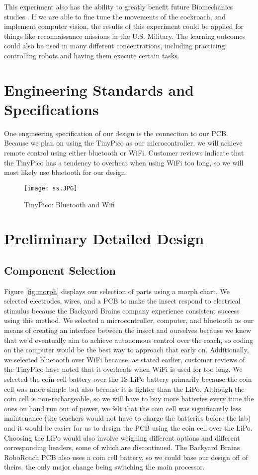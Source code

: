 \documentclass{article}
\begin{document}
 This experiment also has the ability to greatly benefit future  Biomechanics studies . If we are able to fine tune the movements of the cockroach, and implement computer vision, the results of this experiment could be applied for things like reconnaissance missions in the U.S. Military. The learning outcomes could also be used in many different concentrations, including practicing controlling robots and having them execute certain tasks. 

\section{Engineering Standards and Specifications}
 One engineering specification of our design is the connection to our PCB. Because we plan on using the TinyPico as our microcontroller, we will achieve remote control using either bluetooth or WiFi. Customer reviews indicate that the TinyPico has a tendency to overheat when using WiFi too long, so we will most likely use bluetooth for our design.

\begin{figure}[ht!]
\centering
\texttt{[image: ss.JPG]}
\caption{TinyPico: Bluetooth and Wifi}
\label{fig:ss}
\end{figure}

\section{Preliminary Detailed Design}

\subsection{Component Selection}
 Figure \ref{fig:morph} displays our selection of parts using a morph chart. We selected electrodes, wires, and a PCB to make the insect respond to electrical stimulus because the Backyard Brains company experience consistent success using this method. We selected a microcontroller, computer, and bluetooth as our means of creating an interface between the insect and ourselves because we knew that we'd eventually aim to achieve autonomous control over the roach, so coding on the computer would be the best way to approach that early on. Additionally, we selected bluetooth over WiFi because, as stated earlier, customer reviews of the TinyPico have noted that it overheats when WiFi is used for too long. We selected the coin cell battery over the 1S LiPo battery primarily because the coin cell was more simple but also because it is lighter than the LiPo. Although the coin cell is non-rechargeable, so we will have to buy more batteries every time the ones on hand run out of power, we felt that the coin cell was significantly less maintenance (the teachers would not have to charge the batteries before the lab) and it would be easier for us to design the PCB using the coin cell over the LiPo. Choosing the LiPo would also involve weighing different options and different corresponding headers, some of which are discontinued. The Backyard Brains RoboRoach PCB also uses a coin cell battery, so we could base our design off of theirs, the only major change being switching the main processor.
\end{document}
